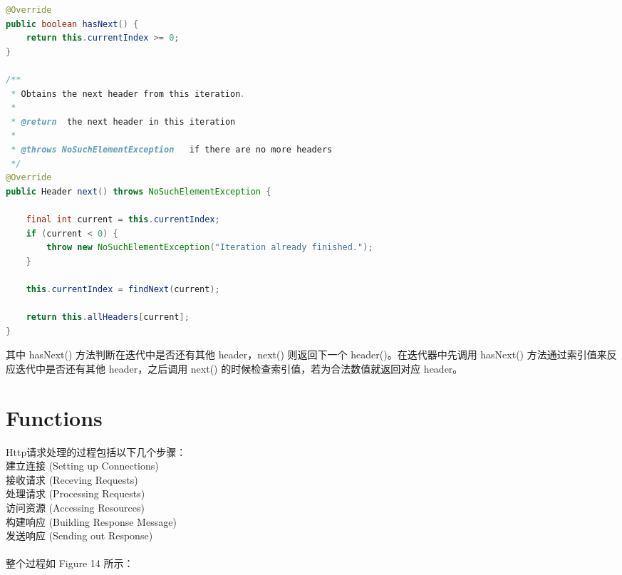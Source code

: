 \documentclass{article}
\begin{document}
	\begin{lstlisting}[language={java}]
@Override
public boolean hasNext() {
    return this.currentIndex >= 0;
}

/**
 * Obtains the next header from this iteration.
 *
 * @return  the next header in this iteration
 *
 * @throws NoSuchElementException   if there are no more headers
 */
@Override
public Header next() throws NoSuchElementException {

    final int current = this.currentIndex;
    if (current < 0) {
        throw new NoSuchElementException("Iteration already finished.");
    }

    this.currentIndex = findNext(current);

    return this.allHeaders[current];
}
	\end{lstlisting}
	\begin{CJK}{UTF8}{gbsn}
		\indent \indent  其中 hasNext() 方法判断在迭代中是否还有其他 header，next() 则返回下一个 header()。在迭代器中先调用 hasNext() 方法通过索引值来反应迭代中是否还有其他 header，之后调用 next() 的时候检查索引值，若为合法数值就返回对应 header。
	\end{CJK}{}

	\clearpage
	\section{Functions}
	\begin{CJK}{UTF8}{gbsn}
		Http请求处理的过程包括以下几个步骤：\\
		\indent 建立连接 (Setting up Connections)\\
		\indent 接收请求 (Receving Requests)\\
		\indent 处理请求 (Processing Requests)\\
		\indent 访问资源 (Accessing Resources)\\
		\indent 构建响应 (Building Response Message)\\
		\indent 发送响应 (Sending out Response)\\
		\hspace*{\fill} \\ %
		整个过程如 Figure 14 所示：
	\end{CJK}{}
\end{document}
